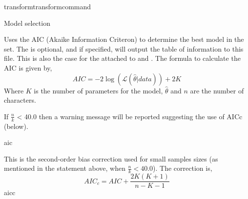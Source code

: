 \begin{command}{transform}{transformcommand}
\begin{arguments}
\begin {argumentgroup}{Model selection}
                {Uses the AIC (Akaike Information Criteron) to determine
                the best model in the set. The \poystring is optional, and if specified, 
                \poy will output the table of information  to this file.  This is also the case
                for the \poystring attached to  and .
                The formula to calculate the AIC is given by,
                \begin{equation*}
                    AIC = - 2 \log(\mathcal{L}(\hat{\theta}|data)) + 2  K
                \end{equation*}
                Where $K$ is the number of parameters for the model,
                $\hat{\theta}$ and $n$ are the number of characters. 
                \begin{statement}
                    If $\frac{n}{k}$ < 40.0 then a warning message will be
                    reported suggesting the use of AICc (below).
                \end{statement} }
                {aic}

                {This is the second-order bias correction used for small
                samples sizes (as mentioned in the statement above, when
                $\frac{n}{k} < 40.0$). The correction is,
                \begin{equation*}
                    AIC_c = AIC + \frac{2K(K+1)} {n-K-1}
                \end{equation*}}
                {aicc}
            

\end{argumentgroup}
\end{arguments}
\end{command}
